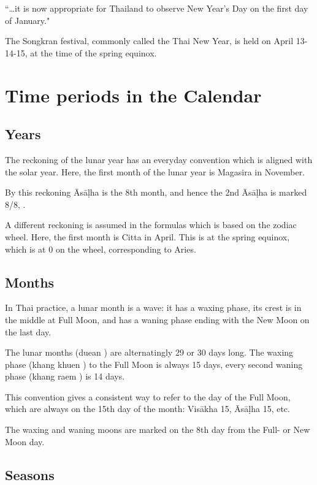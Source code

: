 \documentclass[11pt,oneside]{memoir-article}
\begin{document}
``\ldots{}it is now appropriate for Thailand to observe New Year's Day on the first day of January."\autocite{TODO}


The Songkran festival, commonly called the Thai New Year, is held on April
13-14-15, at the time of the spring equinox.

\section{Time periods in the Calendar}
\label{sec-3-2}
\label{years-seasons}

\subsection{Years}
\label{sec-3-2-1}

The reckoning of the lunar year has an everyday convention which is aligned with
the solar year. Here, the first month of the lunar year is Magasira in November.

By this reckoning Āsāḷha is the 8th month, and hence the 2nd Āsāḷha is marked
8/8, .

A different reckoning is assumed in the formulas which is based on the zodiac
wheel. Here, the first month is Citta in April. This is at the spring equinox,
which is at 0\degrees{} on the wheel, corresponding to Aries.

\subsection{Months}
\label{sec-3-2-2}

In Thai practice, a lunar month is a wave: it has a waxing phase, its crest is
in the middle at Full Moon, and has a waning phase ending with the New Moon on
the last day.

The lunar months (duean ) are alternatingly 29 or 30 days long. The
waxing phase (khang khuen ) to the Full Moon is always 15 days,
every second waning phase (khang raem ) is 14 days.\autocite{TODO}


This convention gives a consistent way to refer to the day of the Full Moon,
which are always on the 15th day of the month: Visākha 15, Āsāḷha 15, etc.

The waxing and waning moons are marked on the 8th day from the Full- or New Moon
day.

\clearpage

\subsection{Seasons}
\label{sec-3-2-3}
\end{document}
